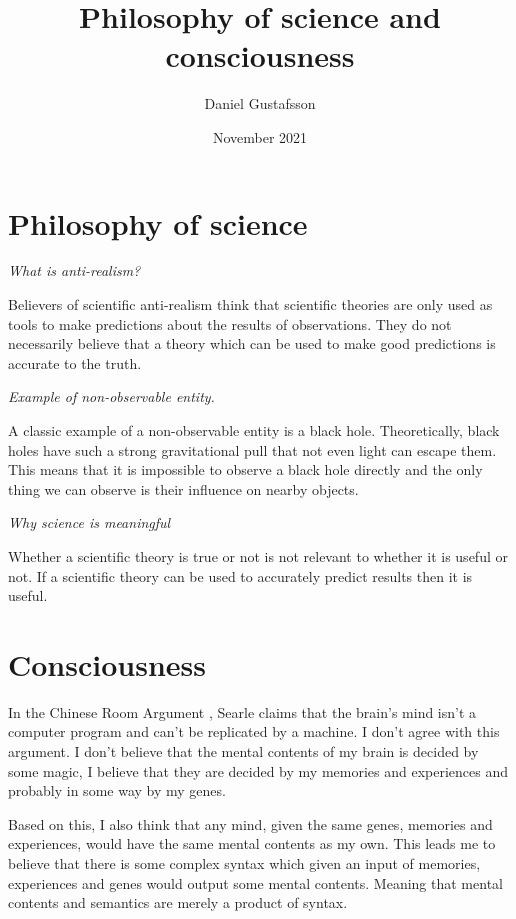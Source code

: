 \documentclass[11pt, a4paper]{article}
\title{Philosophy of science and consciousness}
\author{Daniel Gustafsson}
\date{November 2021}
\begin{document}
\maketitle

\section{Philosophy of science}

\textit{What is anti-realism?}

Believers of scientific anti-realism think that scientific theories are
only used as tools to make predictions about the results of observations.
They do not necessarily believe that a theory which can be used to make
good predictions is accurate to the truth.

\vspace{2mm}\noindent\textit{Example of non-observable entity.}

A classic example of a non-observable entity is a black hole.
Theoretically, black holes have such a strong gravitational pull that
not even light can escape them. This means that it is impossible to observe
a black hole directly and the only thing we can observe is their influence
on nearby objects.

\vspace{2mm}\noindent\textit{Why science is meaningful}

Whether a scientific theory is true or not is not relevant to whether it
is useful or not. If a scientific theory can be used to accurately predict
results then it is useful.

\section{Consciousness}

In the Chinese Room Argument \cite{cra}, Searle claims that the brain's mind isn't
a computer program and can't be replicated by a machine. I don't agree with this
argument. I don't believe that the mental contents of my brain is decided by some
magic, I believe that they are decided by my memories and experiences and probably
in some way by my genes.

Based on this, I also think that any mind, given the same genes, memories and
experiences, would have the same mental contents as my own.
This leads me to believe that there is some complex syntax which given an input
of memories, experiences and genes would output some mental contents. Meaning that
mental contents and semantics are merely a product of syntax.
\end{document}
